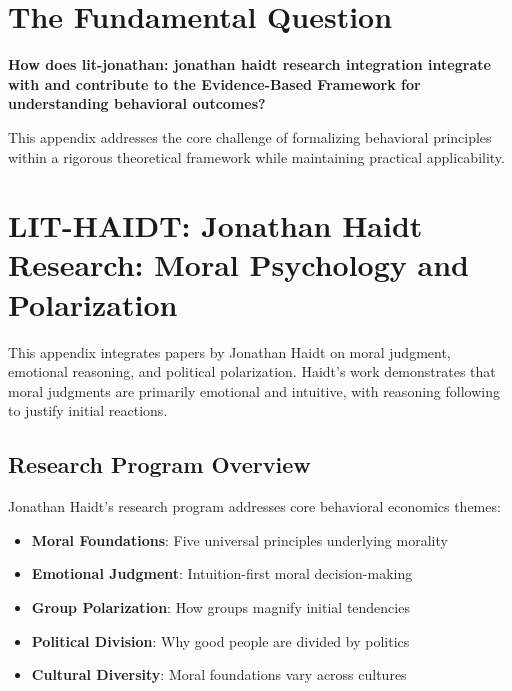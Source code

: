 \section{The Fundamental Question}
\label{sec:hai-fundamental}

\begin{tcolorbox}[
    colback=red!5!white,
    colframe=red!75!black,
    title={\textbf{Fundamental Question}}
]
\textbf{How does lit-jonathan: jonathan haidt research integration integrate with and contribute to the
Evidence-Based Framework for understanding behavioral outcomes?}

This appendix addresses the core challenge of formalizing behavioral principles
within a rigorous theoretical framework while maintaining practical applicability.
\end{tcolorbox}




\section{LIT-HAIDT: Jonathan Haidt Research: Moral Psychology and Polarization}
\label{app:litz}

This appendix integrates papers by Jonathan Haidt on moral judgment,
emotional reasoning, and political polarization. Haidt's work demonstrates that moral
judgments are primarily emotional and intuitive, with reasoning following to justify
initial reactions.

\subsection{Research Program Overview}

Jonathan Haidt's research program addresses core behavioral economics themes:

\begin{itemize}
  \item \textbf{Moral Foundations}: Five universal principles underlying morality
  \item \textbf{Emotional Judgment}: Intuition-first moral decision-making
  \item \textbf{Group Polarization}: How groups magnify initial tendencies
  \item \textbf{Political Division}: Why good people are divided by politics
  \item \textbf{Cultural Diversity}: Moral foundations vary across cultures
\end{itemize}

